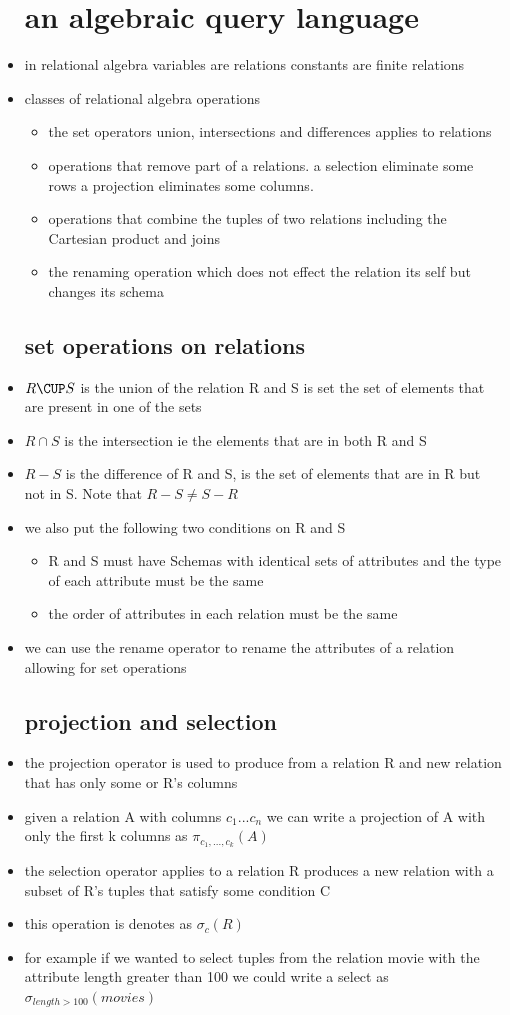 \documentclass{article}
\begin{document}
\begin{itemize}
\section{an algebraic query language}
\item in relational algebra variables are relations constants are finite relations 
\item classes of relational algebra operations 
\begin{itemize}
    \item the set operators union, intersections and differences applies to relations
    \item operations that remove part of a relations. a selection eliminate some rows a projection eliminates some columns. 
    \item operations that combine the tuples of two relations including the Cartesian product and joins
    \item the renaming operation which does not effect the relation its self but changes its schema
\end{itemize}
\subsection{set operations on relations}
\item $R\CUP S$ is the union of the relation R and S is set the set of elements that are present in one of the sets
\item $R\cap S$ is the intersection ie the elements that are in both R and S
\item $R-S$ is the difference of R and S, is the set of elements that are in R but not in S. Note that $R-S\neq S-R$
\item we also put the following two conditions on R and S 
\begin{itemize}
    \item R and S must have Schemas with identical sets of attributes and the type of each attribute must be the same 
    \item the order of attributes in each relation must be the same 
\end{itemize}
\item we can use the rename operator to rename the attributes of a relation allowing for set operations 
\subsection{projection and selection}
\item the projection operator is used to produce from a relation R and new relation that has only some or R's columns 
\item given a relation A with columns $c_1...c_n$ we can write a projection of A with only the first k columns as $\pi_{c_1,...,c_k}(A)$
\item the selection operator applies to a relation R produces a new relation with a subset of R's tuples that satisfy some condition C 
\item this operation is denotes as $\sigma_{c}(R)$
\item  for example if we wanted to select tuples from the relation movie with the attribute length greater than 100 we could write a select as $\sigma_{length>100}(movies)$

\end{itemize}
\end{document}
